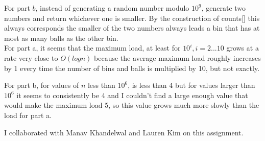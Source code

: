 \documentclass{article}
\begin{document}
\begin{enumerate}
	For part $b$, instead of generating a random number modulo $10^9$, generate two numbers and return whichever one is smaller.  By the construction of counts[] this always corresponds the smaller of the two numbers always leads a bin that has at most as many balls as the other bin.  \\
	
	For part a, it seems that the maximum load, at least for $10^i, i = 2...10$ grows at a rate very close to $O(logn)$ because the average maximum load roughly increases by 1 every time the number of bins and balls is multiplied by 10, but not exactly.  
	
	For part b, for values of $n$ less than $10^6$, is less than 4 but for values larger than $10^6$ it seems to consistently be 4 and I couldn't find a large enough value that would make the maximum load 5, so this value grows much more slowly than the load for part a. 
	
	
\end{enumerate}

	\newpage I collaborated with Manav Khandelwal and Lauren Kim on this assignment.  
\end{document}
